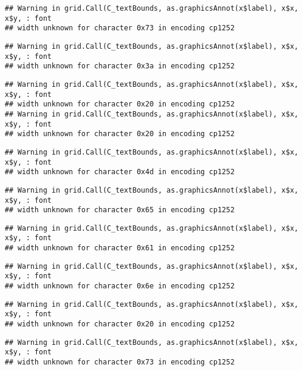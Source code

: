 \documentclass[
]{article}
\begin{document}
\begin{verbatim}
## Warning in grid.Call(C_textBounds, as.graphicsAnnot(x$label), x$x, x$y, : font
## width unknown for character 0x73 in encoding cp1252
\end{verbatim}

\begin{verbatim}
## Warning in grid.Call(C_textBounds, as.graphicsAnnot(x$label), x$x, x$y, : font
## width unknown for character 0x3a in encoding cp1252
\end{verbatim}

\begin{verbatim}
## Warning in grid.Call(C_textBounds, as.graphicsAnnot(x$label), x$x, x$y, : font
## width unknown for character 0x20 in encoding cp1252
## Warning in grid.Call(C_textBounds, as.graphicsAnnot(x$label), x$x, x$y, : font
## width unknown for character 0x20 in encoding cp1252
\end{verbatim}

\begin{verbatim}
## Warning in grid.Call(C_textBounds, as.graphicsAnnot(x$label), x$x, x$y, : font
## width unknown for character 0x4d in encoding cp1252
\end{verbatim}

\begin{verbatim}
## Warning in grid.Call(C_textBounds, as.graphicsAnnot(x$label), x$x, x$y, : font
## width unknown for character 0x65 in encoding cp1252
\end{verbatim}

\begin{verbatim}
## Warning in grid.Call(C_textBounds, as.graphicsAnnot(x$label), x$x, x$y, : font
## width unknown for character 0x61 in encoding cp1252
\end{verbatim}

\begin{verbatim}
## Warning in grid.Call(C_textBounds, as.graphicsAnnot(x$label), x$x, x$y, : font
## width unknown for character 0x6e in encoding cp1252
\end{verbatim}

\begin{verbatim}
## Warning in grid.Call(C_textBounds, as.graphicsAnnot(x$label), x$x, x$y, : font
## width unknown for character 0x20 in encoding cp1252
\end{verbatim}

\begin{verbatim}
## Warning in grid.Call(C_textBounds, as.graphicsAnnot(x$label), x$x, x$y, : font
## width unknown for character 0x73 in encoding cp1252
\end{verbatim}
\end{document}

